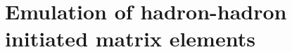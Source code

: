 \documentclass[main.tex]{subfiles}
\begin{document}
\chapter{Emulation of hadron-hadron initiated matrix elements}
\label{chapter:fame3}
\end{document}
